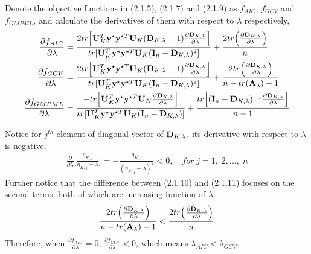 \documentclass[11pt]{article}
\begin{document}
Denote the objective functions in (2.1.5), (2.1.7) and (2.1.9) as $f_{AIC}$, $f_{GCV}$ and $f_{GMPML}$, and calculate the derivatives of them with respect to $\lambda$ respectively,
\begin{align}
\frac{\partial f_{AIC}}{\partial \lambda}&=\frac{2tr\Big[{\bf U}_K^T{\bf y}^\star {\bf y}^{\star T}{\bf U}_K({\bf D}_{K, \lambda}-1)\frac{\partial {\bf D}_{K, \lambda}}{\partial \lambda}\Big]}{tr[{\bf U}_K^T{\bf y}^\star {\bf y}^{\star T}{\bf U}_K({\bf I}_n-{\bf D}_{K, \lambda})^2]}+\frac{2tr\Big(\frac{\partial {\bf D}_{K, \lambda}}{\partial \lambda}\Big)}{n}\\
\frac{\partial f_{GCV}}{\partial \lambda}&=\frac{2tr\Big[{\bf U}_K^T{\bf y}^\star {\bf y}^{\star T}{\bf U}_K({\bf D}_{K, \lambda}-1)\frac{\partial {\bf D}_{K, \lambda}}{\partial \lambda}\Big]}{tr[{\bf U}_K^T{\bf y}^\star {\bf y}^{\star T}{\bf U}_K({\bf I}_n-{\bf D}_{K, \lambda})^2]}+\frac{2tr\Big(\frac{\partial {\bf D}_{K, \lambda}}{\partial \lambda}\Big)}{n-tr({\bf A}_\lambda)-1}\\
\frac{\partial f_{GMPML}}{\partial \lambda}&=\frac{-tr\Big[{\bf U}_K^T{\bf y}^\star {\bf y}^{\star T}{\bf U}_K \frac{\partial {\bf D}_{K, \lambda}}{\partial \lambda}\Big]}{tr[{\bf U}_K^T{\bf y}^\star {\bf y}^{\star T}{\bf U}_K({\bf I}_n-{\bf D}_{K, \lambda})]}+\frac{tr\Big[({\bf I}_n-{\bf D}_{K, \lambda})^{-1}\frac{\partial {\bf D}_{K, \lambda}}{\partial \lambda}\Big]}{n-1}
\end{align}

Notice for $j^{th}$ element of diagonal vector of ${\bf D}_{K, \lambda}$, its derivative with respect to $\lambda$ is negative,
\begin{align*}
\frac{\partial }{\partial \lambda}\Big[\frac{\eta_{K, j}}{\eta_{K, j}+\lambda}\Big]=-\frac{\eta_{K, j}}{(\eta_{K, j}+\lambda)^2}<0, \quad for\; j=1,\;2,...,\;n
\end{align*}
Further notice that the difference between (2.1.10) and (2.1.11) focuses on the second terms, both of which are increasing function of $\lambda$.
\begin{align*}
\frac{2tr\Big(\frac{\partial {\bf D}_{K, \lambda}}{\partial \lambda}\Big)}{n-tr({\bf A}_\lambda)-1}<\frac{2tr\Big(\frac{\partial {\bf D}_{K, \lambda}}{\partial \lambda}\Big)}{n}
\end{align*}
Therefore, when $\frac{\partial f_{AIC}}{\partial \lambda}=0$, $\frac{\partial f_{GCV}}{\partial \lambda}<0$, which means $\lambda_{AIC}<\lambda_{GCV}$.\\
\end{document}
